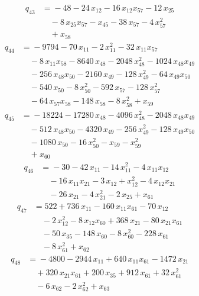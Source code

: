 \documentclass[11pt]{article}
\theoremstyle{remark}\newtheorem{remark}[theorem]{Remark}
\begin{document}
\begin{align*}
q_{43} &={}-48 -24\,x_{12} -16\,x_{12}x_{57} -12\,x_{25}\\
&\quad -8\,x_{25}x_{57} -x_{45} -38\,x_{57} -4\,x_{57}^{2}\\
&\quad +x_{58}
\end{align*}
\begin{align*}
q_{44} &={}-9794 -70\,x_{11} -2\,x_{11}^{2} -32\,x_{11}x_{57}\\
&\quad -8\,x_{11}x_{58} -8640\,x_{48} -2048\,x_{48}^{2} -1024\,x_{48}x_{49}\\
&\quad -256\,x_{48}x_{50} -2160\,x_{49} -128\,x_{49}^{2} -64\,x_{49}x_{50}\\
&\quad -540\,x_{50} -8\,x_{50}^{2} -592\,x_{57} -128\,x_{57}^{2}\\
&\quad -64\,x_{57}x_{58} -148\,x_{58} -8\,x_{58}^{2} +x_{59}
\end{align*}
\begin{align*}
q_{45} &={}-18224 -17280\,x_{48} -4096\,x_{48}^{2} -2048\,x_{48}x_{49}\\
&\quad -512\,x_{48}x_{50} -4320\,x_{49} -256\,x_{49}^{2} -128\,x_{49}x_{50}\\
&\quad -1080\,x_{50} -16\,x_{50}^{2} -x_{59} -x_{59}^{2}\\
&\quad +x_{60}
\end{align*}
\begin{align*}
q_{46} &={}-30 -42\,x_{11} -14\,x_{11}^{2} -4\,x_{11}x_{12}\\
&\quad -16\,x_{11}x_{21} -3\,x_{12} +x_{12}^{2} -4\,x_{12}x_{21}\\
&\quad -26\,x_{21} -4\,x_{21}^{2} -2\,x_{25} +x_{61}
\end{align*}
\begin{align*}
q_{47} &={}522 +736\,x_{11} -160\,x_{11}x_{61} -70\,x_{12}\\
&\quad -2\,x_{12}^{2} -8\,x_{12}x_{60} +368\,x_{21} -80\,x_{21}x_{61}\\
&\quad -50\,x_{35} -148\,x_{60} -8\,x_{60}^{2} -228\,x_{61}\\
&\quad -8\,x_{61}^{2} +x_{62}
\end{align*}
\begin{align*}
q_{48} &={}-4800 -2944\,x_{11} +640\,x_{11}x_{61} -1472\,x_{21}\\
&\quad +320\,x_{21}x_{61} +200\,x_{35} +912\,x_{61} +32\,x_{61}^{2}\\
&\quad -6\,x_{62} -2\,x_{62}^{2} +x_{63}
\end{align*}
\end{document}
